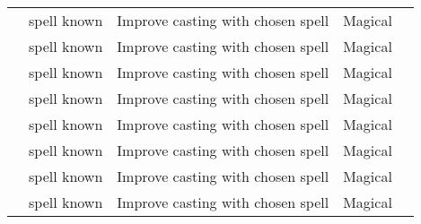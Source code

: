 \begin{longtabuwrapper}
\begin{longtabu}{>{\lcol}p{11em} >{\lcol}p{15em} >{\lcol}X >{\lcol}p{8em} >{\lcol}p{3em}}
           &  spell known   & Improve casting with chosen spell            & Magical &    \\
           &  spell known   & Improve casting with chosen spell            & Magical &    \\
          &  spell known  & Improve casting with chosen spell            & Magical &   \\
              &  spell known      & Improve casting with chosen spell            & Magical &       \\
         &  spell known & Improve casting with chosen spell            & Magical &  \\
         &  spell known & Improve casting with chosen spell            & Magical &  \\
         &  spell known & Improve casting with chosen spell            & Magical &  \\
         &  spell known & Improve casting with chosen spell            & Magical &  \\


\end{longtabu}
\end{longtabuwrapper}
